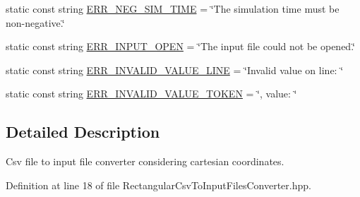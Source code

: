 \begin{DoxyCompactItemize}
static const string \hyperlink{classmultiscale_1_1video_1_1RectangularCsvToInputFilesConverter_ae1971c14899e0fdd7523271de0268924}{\-E\-R\-R\-\_\-\-N\-E\-G\-\_\-\-S\-I\-M\-\_\-\-T\-I\-M\-E} = \char`\"{}\-The simulation time must be non-\/negative.\char`\"{}
\item 
static const string \hyperlink{classmultiscale_1_1video_1_1RectangularCsvToInputFilesConverter_a5d23713c8025b1a50cfce86ae9e1a414}{\-E\-R\-R\-\_\-\-I\-N\-P\-U\-T\-\_\-\-O\-P\-E\-N} = \char`\"{}\-The input file could not be opened.\char`\"{}
\item 
static const string \hyperlink{classmultiscale_1_1video_1_1RectangularCsvToInputFilesConverter_a74375bb73bfbad130b8cf9020ae5b0e6}{\-E\-R\-R\-\_\-\-I\-N\-V\-A\-L\-I\-D\-\_\-\-V\-A\-L\-U\-E\-\_\-\-L\-I\-N\-E} = \char`\"{}\-Invalid value on line\-: \char`\"{}
\item 
static const string \hyperlink{classmultiscale_1_1video_1_1RectangularCsvToInputFilesConverter_af32101eebb5b7f8d6773e30516728415}{\-E\-R\-R\-\_\-\-I\-N\-V\-A\-L\-I\-D\-\_\-\-V\-A\-L\-U\-E\-\_\-\-T\-O\-K\-E\-N} = \char`\"{}, value\-: \char`\"{}
\end{DoxyCompactItemize}


\subsection{\-Detailed \-Description}
\-Csv file to input file converter considering cartesian coordinates. 

\-Definition at line 18 of file \-Rectangular\-Csv\-To\-Input\-Files\-Converter.\-hpp.



